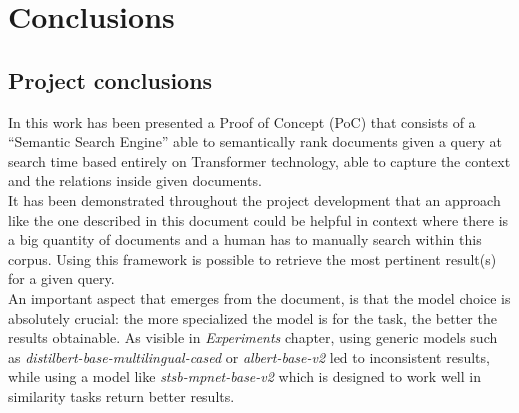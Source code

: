 \documentclass[\main/main.tex]{subfiles}
\begin{document}
\chapter{Conclusions}
\section{Project conclusions}
In this work has been presented a Proof of Concept (PoC) that consists of a ``Semantic Search Engine'' able to semantically rank documents given a query at search time based entirely on Transformer technology, able to capture the context and the relations inside given documents. \\
It has been demonstrated throughout the project development that an approach like the one described in this document could be helpful in context where there is a big quantity of documents and a human has to manually search within this corpus. Using this framework is possible to retrieve the most pertinent result(s) for a given query. \\
An important aspect that emerges from the document, is that the model choice is absolutely crucial: the more specialized the model is for the task, the better the results obtainable. As visible in \emph{Experiments} chapter, using generic models such as \emph{distilbert-base-multilingual-cased} or \emph{albert-base-v2} led to inconsistent results, while using a model like \emph{stsb-mpnet-base-v2} which is designed to work well in similarity tasks return better results.
\end{document}
